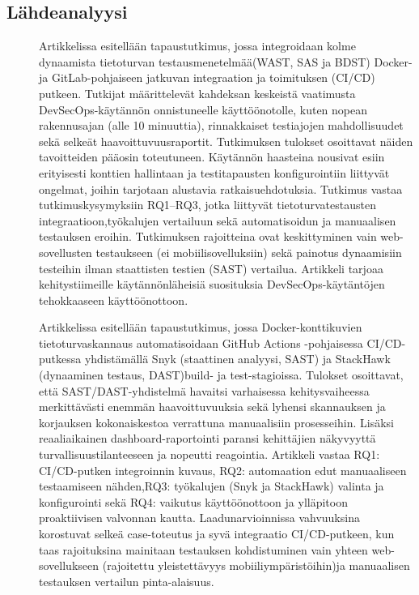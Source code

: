 \documentclass[bscthesis,finnish,oneside,biblatex]{uefcsthesis}
\begin{document}
\subsection{Lähdeanalyysi}
\begin{description}
    \item[\cite{rangnau2020_cst}] Artikkelissa esitellään tapaustutkimus, jossa integroidaan kolme dynaamista tietoturvan testausmenetelmää(WAST, SAS ja BDST) Docker- ja GitLab-pohjaiseen jatkuvan integraation ja toimituksen (CI/CD) putkeen. Tutkijat määrittelevät kahdeksan keskeistä vaatimusta DevSecOps-käytännön onnistuneelle käyttöönotolle, kuten nopean rakennusajan (alle 10 minuuttia), rinnakkaiset testiajojen mahdollisuudet sekä selkeät haavoittuvuusraportit. Tutkimuksen tulokset osoittavat näiden tavoitteiden pääosin toteutuneen. Käytännön haasteina nousivat esiin erityisesti konttien hallintaan ja testitapausten konfigurointiin liittyvät ongelmat, joihin tarjotaan alustavia ratkaisuehdotuksia. Tutkimus vastaa tutkimuskysymyksiin RQ1–RQ3, jotka liittyvät tietoturvatestausten integraatioon,työkalujen vertailuun sekä automatisoidun ja manuaalisen testauksen eroihin. Tutkimuksen rajoitteina ovat keskittyminen vain web-sovellusten testaukseen (ei mobiilisovelluksiin) sekä painotus dynaamisiin testeihin ilman staattisten testien (SAST) vertailua. Artikkeli tarjoaa kehitystiimeille käytännönläheisiä suosituksia DevSecOps-käytäntöjen tehokkaaseen käyttöönottoon.
\end{description}

\begin{description}
    \item[\cite{marandi2023_ias}] Artikkelissa esitellään tapaustutkimus, jossa Docker-konttikuvien tietoturvaskannaus automatisoidaan GitHub Actions -pohjaisessa CI/CD-putkessa yhdistämällä Snyk (staattinen analyysi, SAST) ja StackHawk (dynaaminen testaus, DAST)build- ja test-stagioissa. Tulokset osoittavat, että SAST/DAST-yhdistelmä havaitsi varhaisessa kehitysvaiheessa merkittävästi enemmän haavoittuvuuksia sekä lyhensi skannauksen ja korjauksen kokonaiskestoa verrattuna manuaalisiin prosesseihin. Lisäksi reaaliaikainen dashboard-raportointi paransi kehittäjien näkyvyyttä turvallisuustilanteeseen ja nopeutti reagointia. Artikkeli vastaa RQ1: CI/CD-putken integroinnin kuvaus, RQ2: automaation edut manuaaliseen testaamiseen nähden,RQ3: työkalujen (Snyk ja StackHawk) valinta ja konfigurointi sekä RQ4: vaikutus käyttöönottoon ja ylläpitoon proaktiivisen valvonnan kautta. Laadunarvioinnissa vahvuuksina korostuvat selkeä case-toteutus ja syvä integraatio CI/CD-putkeen, kun taas rajoituksina mainitaan testauksen kohdistuminen vain yhteen web-sovellukseen (rajoitettu yleistettävyys mobiiliympäristöihin)ja manuaalisen testauksen vertailun pinta-alaisuus.
\end{description}
\end{document}
